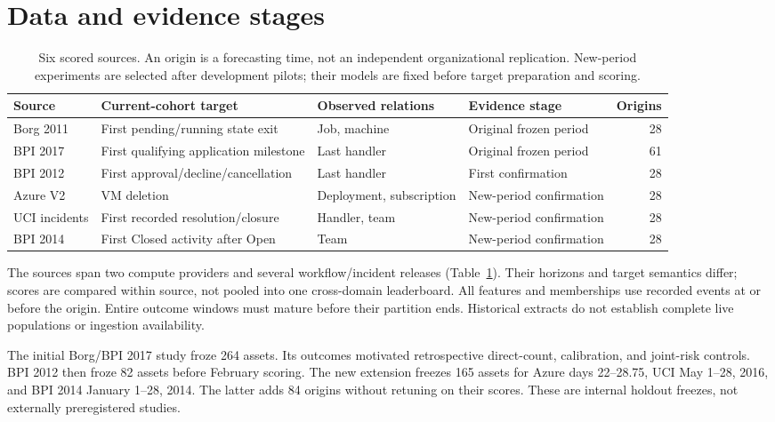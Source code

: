 \section{Data and evidence stages}
\label{sec:data}
\begin{table}[t]
\centering\small
\caption{Six scored sources. An origin is a forecasting time, not an independent
organizational replication. New-period experiments are selected after development
pilots; their models are fixed before target preparation and scoring.}
\label{tab:sources}
\begin{tabular}{llllr}
\toprule
Source & Current-cohort target & Observed relations & Evidence stage & Origins\\
\midrule
Borg 2011 & First pending/running state exit & Job, machine & Original frozen period & 28\\
BPI 2017 & First qualifying application milestone & Last handler & Original frozen period & 61\\
BPI 2012 & First approval/decline/cancellation & Last handler & First confirmation & 28\\
Azure V2 & VM deletion & Deployment, subscription & New-period confirmation & 28\\
UCI incidents & First recorded resolution/closure & Handler, team & New-period confirmation & 28\\
BPI 2014 & First Closed activity after Open & Team & New-period confirmation & 28\\
\bottomrule
\end{tabular}
\end{table}
The sources span two compute providers and several workflow/incident releases
(Table~\ref{tab:sources}). Their horizons and target semantics differ; scores
are compared within source, not pooled into one cross-domain leaderboard.
All features and memberships use recorded events at or before the origin.
Entire outcome windows must mature before their partition ends. Historical
extracts do not establish complete live populations or ingestion availability.

The initial Borg/BPI 2017 study froze 264 assets. Its outcomes motivated
retrospective direct-count, calibration, and joint-risk controls. BPI 2012 then
froze 82 assets before February scoring. The new extension freezes 165 assets
for Azure days 22--28.75, UCI May 1--28, 2016, and BPI 2014 January 1--28,
2014. The latter adds 84 origins without retuning on their scores. These are
internal holdout freezes, not externally preregistered studies.

